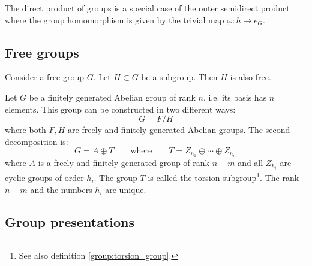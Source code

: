 	\begin{remark}
		The direct product of groups is a special case of the outer semidirect product where the group homomorphism is given by the trivial map $\varphi:h\mapsto e_G$.
	\end{remark}


\subsection{Free groups}

	\begin{property}
		Consider a free group $G$. Let $H\subset G$ be a subgroup. Then $H$ is also free.
	\end{property}
	
	\begin{theorem}\label{group:theorem:free_group}
		Let $G$ be a finitely generated Abelian group of rank $n$, i.e. its basis has $n$ elements. This group can be constructed in two different ways:
		\begin{equation}
			G = F/H
		\end{equation}
		where both $F, H$ are freely and finitely generated Abelian groups. The second decomposition is:
		\begin{equation}
			G = A\oplus T\qquad\text{where}\qquad T = Z_{h_1}\oplus\cdots\oplus Z_{h_m}
		\end{equation}
		where $A$ is a freely and finitely generated group of rank $n-m$ and all $Z_{h_i}$ are cyclic groups of order $h_i$. The group $T$ is called the torsion subgroup\footnote{See also definition \ref{group:torsion_group}.}. The rank $n-m$ and the numbers $h_i$ are unique.
	\end{theorem}

\subsection{Group presentations}

